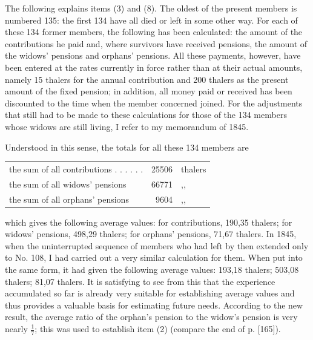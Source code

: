 \noindent\hspace*{\parindent}The following explains items (3) and (8). The oldest of the present members is numbered 135: the first 134 have all died or left in some other way. For each of these 134 former members, the following has been calculated: the amount of the contributions he paid and, where survivors have received pensions, the amount of the widows' pensions and orphans' pensions. All these payments, however, have been entered at the rates currently in force rather than at their actual amounts, namely 15 thalers for the annual contribution and 200 thalers as the present amount of the fixed pension; in addition, all money paid or received has been discounted to the time when the member concerned joined. For the adjustments that still had to be made to these calculations for those of the 134 members whose widows are still living, I refer to my memorandum of 1845.

Understood in this sense, the totals for all these 134 members are
\begin{center}
\begin{tabular}{l r l}
the sum of all contributions . . . . . .&25506&thalers\\
the sum of all widows' pensions&66771&,,\\
the sum of all orphans' pensions&9604&,,
\end{tabular}
\end{center}
\noindent which gives the following average values: for contributions, 190,35 thalers; for widows' pensions, 498,29 thalers; for orphans' pensions, 71,67 thalers. In 1845, when the uninterrupted sequence of members who had left by then extended only to No. 108, I had carried out a very similar calculation for them. When put into the same form, it had given the following average values: 193,18 thalers; 503,08 thalers; 81,07 thalers. It is satisfying to see from this that the experience accumulated so far is already very suitable for establishing average values and thus provides a valuable basis for estimating future needs. According to the new result, the average ratio of the orphan's pension to the widow's pension is very nearly \(\tfrac{1}{7}\); this was used to establish item (2) (compare the end of p. [165]).

